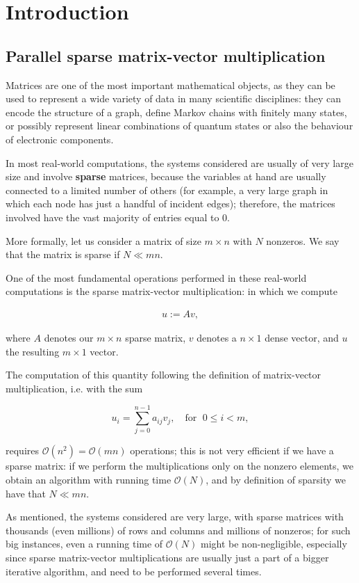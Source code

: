 \chapter{Introduction}
\section{Parallel sparse matrix-vector multiplication}
Matrices are one of the most important mathematical objects, as they can be used to represent a wide variety of data in many scientific disciplines: they can encode the structure of a graph, define Markov chains with finitely many states, or possibly represent linear combinations of quantum states or also the behaviour of electronic components. 

In most real-world computations, the systems considered are usually of very large size and involve \textbf{sparse} matrices, because the variables at hand are usually connected to a limited number of others (for example, a very large graph in which each node has just a handful of incident edges); therefore, the matrices involved have the vast majority of entries equal to 0.

More formally, let us consider a matrix of size $m \times n$ with $N$ nonzeros. We say that the matrix is sparse if $ N \ll mn $.

One of the most fundamental operations performed in these real-world computations is the sparse matrix-vector multiplication: in which we compute

\begin{align}
	u:=Av,
	\label{uAv}
\end{align}

where $A$ denotes our $m \times n$ sparse matrix, $v$ denotes a $n \times 1$ dense vector, and $u$ the resulting $m \times 1$ vector.

The computation of this quantity following the definition of matrix-vector multiplication, i.e. with the sum 

\[ 
	u_i = \sum_{j=0}^{n-1} a_{ij} v_j, \quad \text{for }\; 0 \leq i < m,
\]

requires $\mathcal{O}(n^2) = \mathcal{O}(mn)$ operations; this is not very efficient if we have a sparse matrix: if we perform the multiplications only on the nonzero elements, we obtain an algorithm with running time $\mathcal{O}(N)$, and by definition of sparsity we have that $N \ll mn$.

As mentioned, the systems considered are very large, with sparse matrices with thousands (even millions) of rows and columns and millions of nonzeros; for such big instances, even a running time of $\mathcal{O}(N)$ might be non-negligible, especially since sparse matrix-vector multiplications are usually just a part of a bigger iterative algorithm, and need to be performed several times.

